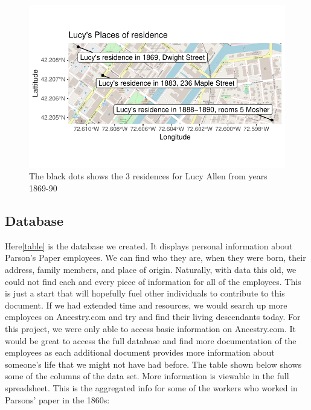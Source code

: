 \documentclass[
  letterpaper,
  DIV=11,
  numbers=noendperiod]{scrartcl}
\begin{document}
\begin{figure}

{\centering \includegraphics{workers_database_files/figure-pdf/fig-sample7-1.pdf}

}

\caption{\label{fig-sample7}The black dots shows the 3 residences for
Lucy Allen from years 1869-90}

\end{figure}

\hypertarget{database}{%
\subsection{Database}\label{database}}

Here\ref{table} is the database we created. It displays personal
information about Parson's Paper employees. We can find who they are,
when they were born, their address, family members, and place of origin.
Naturally, with data this old, we could not find each and every piece of
information for all of the employees. This is just a start that will
hopefully fuel other individuals to contribute to this document. If we
had extended time and resources, we would search up more employees on
Ancestry.com and try and find their living descendants today. For this
project, we were only able to access basic information on Ancestry.com.
It would be great to access the full database and find more
documentation of the employees as each additional document provides more
information about someone's life that we might not have had before. The
table shown below shows some of the columns of the data set. More
information is viewable in the full spreadsheet. This is the aggregated
info for some of the workers who worked in Parsons' paper in the 1860s:
\end{document}
